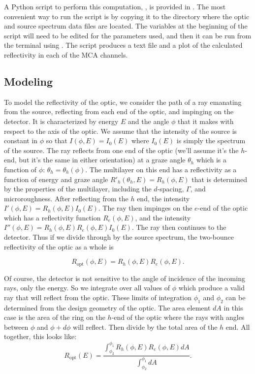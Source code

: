 A Python script to perform this computation, , is provided
in . The most convenient way to run the script is by
copying it to the directory where the optic and source spectrum data files are
located. The variables at the beginning of the script will need to be edited for
the parameters used, and then it can be run from the terminal using
. The script produces a text file and a plot of the
calculated reflectivity in each of the MCA channels.

\subsection{Modeling}

To model the reflectivity of the optic, we consider the path of a ray emanating
from the source, reflecting from each end of the optic, and impinging on the
detector. It is characterized by energy $E$ and the angle $\phi$ that it makes
with respect to the axis of the optic. We assume that the intensity of the
source is constant in $\phi$ so that $I(\phi, E) = I_0(E)$ where $I_0(E)$ is
simply the spectrum of the source. The ray reflects from one end of the optic
(we'll assume it's the $h$-end, but it's the same in either orientation) at a
graze angle $\theta_h$ which is a function of $\phi$:
$\theta_h = \theta_h(\phi)$. The multilayer on this end has a reflectivity as a
function of energy and graze angle $R'_h(\theta_h, E) = R_h(\phi, E)$ that is
determined by the properties of the multilayer, including the $d$-spacing,
$\Gamma$, and microroughness. After reflecting from the $h$ end, the intensity
$I'(\phi, E) = R_h(\phi, E) I_0(E)$. The ray then impinges on the $e$-end of the
optic which has a reflectivity function $R_e(\phi, E)$, and the intensity
$I''(\phi, E) = R_h(\phi, E) R_e(\phi, E) I_0(E)$. The ray then continues to the
detector. Thus if we divide through by the source spectrum, the two-bounce
reflectivity of the optic as a whole is

\begin{equation}
  R_\text{opt}(\phi, E) = R_h(\phi, E) R_e(\phi, E) .
  \label{eq:dbl_bounce}
\end{equation}

Of course, the detector is not sensitive to the angle of incidence of the
incoming rays, only the energy. So we integrate over all values of $\phi$ which
produce a valid ray that will reflect from the optic. These limits of
integration $\phi_1$ and $\phi_2$ can be determined from the design geometry of
the optic. The area element $dA$ in this case is the area of the ring on the $h$-end
of the optic where the rays with angles between $\phi$ and $\phi + d\phi$ will
reflect. Then divide by the total area of the $h$ end. All together, this looks
like:
\begin{equation}
  \label{eq:area_int}
  R_\text{opt}(E) = \frac{\int^{\phi_1}_{\phi_2} R_h(\phi, E) R_e(\phi, E) dA}{
    \int^{\phi_1}_{\phi_2} dA } .
\end{equation}

